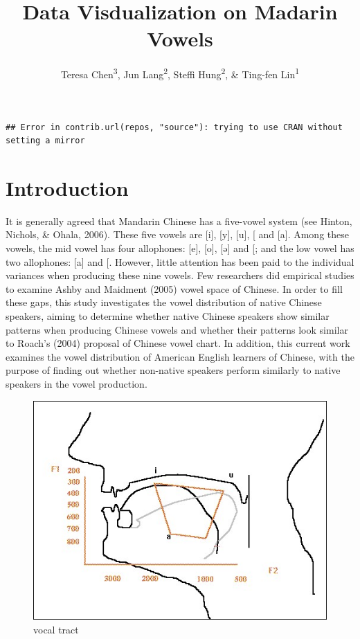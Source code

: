 \documentclass[man, fleqn, noextraspace]{apa6}
\title{Data Visdualization on Madarin Vowels}
\author{Teresa Chen\textsuperscript{3}, Jun Lang\textsuperscript{2}, Steffi
Hung\textsuperscript{2}, \& Ting-fen Lin\textsuperscript{1}}
\date{}
\begin{document}
\maketitle

{
\setcounter{tocdepth}{5}
\tableofcontents
}
\begin{verbatim}
## Error in contrib.url(repos, "source"): trying to use CRAN without setting a mirror
\end{verbatim}

\newpage

\section{Introduction}\label{introduction}

It is generally agreed that Mandarin Chinese has a five-vowel system
(see Hinton, Nichols, \& Ohala, 2006). These five vowels are {[}i{]},
{[}y{]}, {[}u{]}, {[}\ipatext{ə}{]} and {[}a{]}. Among these vowels, the
mid vowel has four allophones: {[}e{]}, {[}o{]}, {[}ə{]} and
{[}\ipatext{ɤ}{]}; and the low vowel has two allophones: {[}a{]} and
{[}\ipatext{ɑ}{]}. However, little attention has been paid to the
individual variances when producing these nine vowels. Few researchers
did empirical studies to examine Ashby and Maidment (2005) vowel space
of Chinese. In order to fill these gaps, this study investigates the
vowel distribution of native Chinese speakers, aiming to determine
whether native Chinese speakers show similar patterns when producing
Chinese vowels and whether their patterns look similar to Roach's (2004)
proposal of Chinese vowel chart. In addition, this current work examines
the vowel distribution of American English learners of Chinese, with the
purpose of finding out whether non-native speakers perform similarly to
native speakers in the vowel production.

\begin{figure}
\centering
\includegraphics{picture/mouth.jpg}
\caption{vocal tract}
\end{figure}
\end{document}
